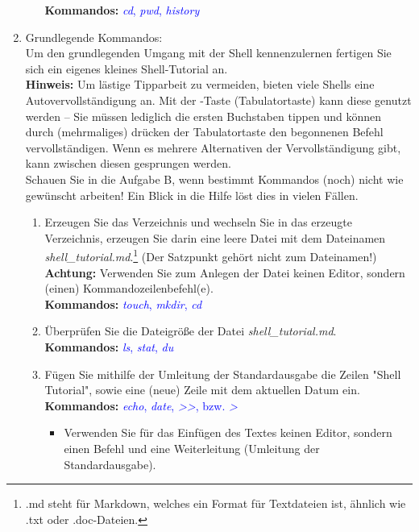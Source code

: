 \documentclass[paper=a4,fontsize=11pt]{scrartcl}%
\numberwithin{equation}{section}
\begin{document}
\begin{enumerate}
\begin{enumerate}[label=(\alph*)]
		\textbf{Kommandos:} \textcolor{blue}{\emph{cd}, \emph{pwd}, \emph{history}}
	\end{enumerate}
	\item Grundlegende Kommandos:\\
  Um den grundlegenden Umgang mit der Shell kennenzulernen fertigen Sie sich ein eigenes kleines Shell-Tutorial an.\\
  \textbf{Hinweis:} Um lästige Tipparbeit zu vermeiden, bieten viele Shells eine Autovervollständigung an. Mit der \keys{\tab}-Taste (Tabulatortaste) kann diese genutzt werden -- Sie müssen lediglich die ersten Buchstaben tippen und können durch (mehrmaliges) drücken der Tabulatortaste den begonnenen Befehl vervollständigen. Wenn es mehrere Alternativen der Vervollständigung gibt, kann zwischen diesen gesprungen werden.\\
  Schauen Sie in die Aufgabe B, wenn bestimmt Kommandos (noch) nicht wie gewünscht arbeiten! Ein Blick in die Hilfe löst dies in vielen Fällen.
  	\begin{enumerate}[label=(\alph*)]
  		\item Erzeugen Sie das Verzeichnis  und wechseln Sie in das erzeugte Verzeichnis, erzeugen Sie darin eine leere Datei mit dem Dateinamen \textit{shell\_tutorial.md}.\footnote{.md steht für Markdown, welches ein Format für Textdateien ist, ähnlich wie .txt oder .doc-Dateien.} (Der Satzpunkt gehört nicht zum Dateinamen!)\\
        \textbf{Achtung:} Verwenden Sie zum Anlegen der Datei keinen Editor, sondern (einen) Kommandozeilenbefehl(e).\\
        \textbf{Kommandos:} \textcolor{blue}{\emph{touch}, \emph{mkdir}, \emph{cd}}
		\item Überprüfen Sie die Dateigröße der Datei \textit{shell\_tutorial.md}.\\
		\textbf{Kommandos:} \textcolor{blue}{\emph{ls}, \emph{stat}, \emph{du}}
		\item Fügen Sie mithilfe der Umleitung der Standardausgabe die Zeilen "Shell Tutorial", sowie eine (neue) Zeile mit dem aktuellen Datum ein.\\
		\textbf{Kommandos:} \textcolor{blue}{\emph{echo}, \emph{date}, \emph{>>}, bzw. \emph{>}}
		\begin{itemize}
			\item \small Verwenden Sie für das Einfügen des Textes keinen Editor, sondern einen Befehl und eine Weiterleitung (Umleitung der Standardausgabe).
		\end{itemize}

\end{enumerate}
\end{enumerate}
\end{document}

